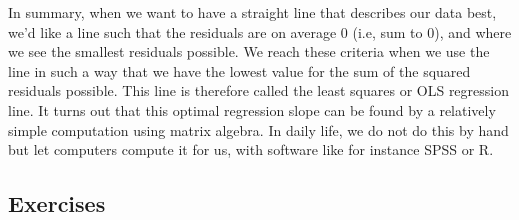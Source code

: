 \documentclass[]{book}\usepackage[]{graphicx}\usepackage[]{color}
\begin{document}
In summary, when we want to have a straight line that describes our data best, we'd like a line such that the residuals are on average 0 (i.e, sum to 0), and where we see the smallest residuals possible. We reach these criteria when we use the line in such a way that we have the lowest value for the sum of the squared residuals possible. This line is therefore called the least squares or OLS regression line. It turns out that this optimal regression slope can be found by a relatively simple computation using matrix algebra. In daily life, we do not do this by hand but let computers compute it for us, with software like for instance SPSS or R.


\subsection{Exercises}
\end{document}
